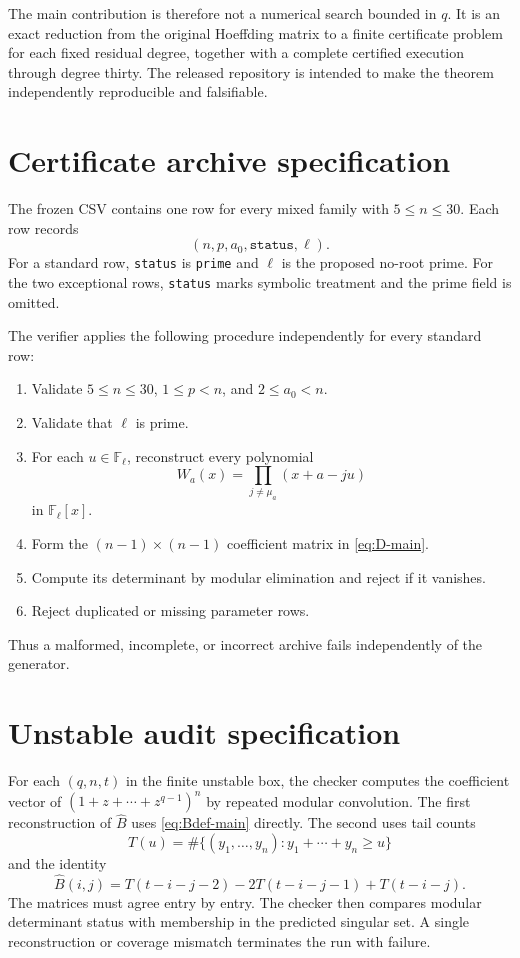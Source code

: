 \documentclass[11pt]{amsart}
\newcommand{\F}{\mathbb F}
\newcommand{\cB}{\widehat B}
\newcommand{\1}{\mathbf 1}
\theoremstyle{remark}
\begin{document}
The main contribution is therefore not a numerical search bounded in $q$. It is an exact reduction from the original Hoeffding matrix to a finite certificate problem for each fixed residual degree, together with a complete certified execution through degree thirty. The released repository is intended to make the theorem independently reproducible and falsifiable.

\appendix

\section{Certificate archive specification}
\label{app:certificates}

The frozen CSV contains one row for every mixed family with $5\le n\le30$. Each row records
\[
 (n,p,a_0,\texttt{status},\ell).
\]
For a standard row, \texttt{status} is \texttt{prime} and $\ell$ is the proposed no-root prime. For the two exceptional rows, \texttt{status} marks symbolic treatment and the prime field is omitted.

The verifier applies the following procedure independently for every standard row:
\begin{enumerate}[label=\arabic*.]
\item Validate $5\le n\le30$, $1\le p<n$, and $2\le a_0<n$.
\item Validate that $\ell$ is prime.
\item For each $u\in\F_\ell$, reconstruct every polynomial
\[
 W_a(x)=\prod_{j\ne\mu_a}(x+a-ju)
\]
in $\F_\ell[x]$.
\item Form the $(n-1)\times(n-1)$ coefficient matrix in \eqref{eq:D-main}.
\item Compute its determinant by modular elimination and reject if it vanishes.
\item Reject duplicated or missing parameter rows.
\end{enumerate}
Thus a malformed, incomplete, or incorrect archive fails independently of the generator.

\section{Unstable audit specification}
\label{app:unstable}

For each $(q,n,t)$ in the finite unstable box, the checker computes the coefficient vector of $(1+z+\cdots+z^{q-1})^n$ by repeated modular convolution. The first reconstruction of $\cB$ uses \eqref{eq:Bdef-main} directly. The second uses tail counts
\[
 T(u)=\#\{(y_1,\ldots,y_n):y_1+\cdots+y_n\ge u\}
\]
and the identity
\[
 \cB(i,j)=T(t-i-j-2)-2T(t-i-j-1)+T(t-i-j).
\]
The matrices must agree entry by entry. The checker then compares modular determinant status with membership in the predicted singular set. A single reconstruction or coverage mismatch terminates the run with failure.
\end{document}
